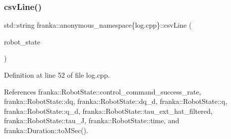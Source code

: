 \subsubsection{\texorpdfstring{csv\+Line()}{csvLine()}\hspace{0.1cm}{\footnotesize\ttfamily [1/2]}}
{\footnotesize\ttfamily std\+::string franka\+::anonymous\+\_\+namespace\{log.\+cpp\}\+::csv\+Line (\begin{DoxyParamCaption}\item[{const \hyperlink{structfranka_1_1RobotState}{franka\+::\+Robot\+State} \&}]{robot\+\_\+state }\end{DoxyParamCaption})}



Definition at line 52 of file log.\+cpp.



References franka\+::\+Robot\+State\+::control\+\_\+command\+\_\+success\+\_\+rate, franka\+::\+Robot\+State\+::dq, franka\+::\+Robot\+State\+::dq\+\_\+d, franka\+::\+Robot\+State\+::q, franka\+::\+Robot\+State\+::q\+\_\+d, franka\+::\+Robot\+State\+::tau\+\_\+ext\+\_\+hat\+\_\+filtered, franka\+::\+Robot\+State\+::tau\+\_\+J, franka\+::\+Robot\+State\+::time, and franka\+::\+Duration\+::to\+M\+Sec().


